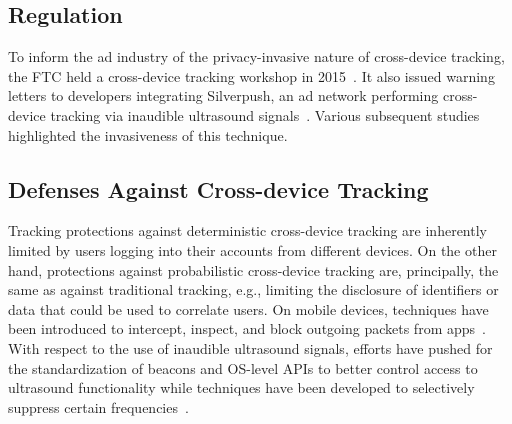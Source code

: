 \subsection{Regulation}

To inform the ad industry of the privacy-invasive nature of cross-device tracking, the FTC held a cross-device tracking workshop in 2015~\cite{ftcCrossDeviceTracking2015}. It also issued warning letters to developers integrating Silverpush, an ad network performing cross-device tracking via inaudible ultrasound signals~\cite{ftcFTCIssuesWarning2016}. Various subsequent studies~\cite{mavroudisPrivacySecurityUltrasound2017,arpPrivacyThreatsUltrasonic2017,matyuninTrackingPrivateBrowsing2018} highlighted the invasiveness of this technique. 

\subsection{Defenses Against Cross-device Tracking}

Tracking protections against deterministic cross-device tracking are inherently limited by users logging into their accounts from different devices. On the other hand, protections against probabilistic cross-device tracking are, principally, the same as against traditional tracking, e.g., limiting the disclosure of identifiers or data that could be used to correlate users. 
On mobile devices, techniques have been introduced to intercept, inspect, and block outgoing packets from apps~\cite{shubaNoMoAdsEffectiveEfficient2018}. With respect to the use of inaudible ultrasound signals, efforts have pushed for the standardization of beacons and OS-level APIs to better control access to ultrasound functionality while techniques have been developed to selectively suppress certain frequencies~\cite{mavroudisPrivacySecurityUltrasound2017}.

